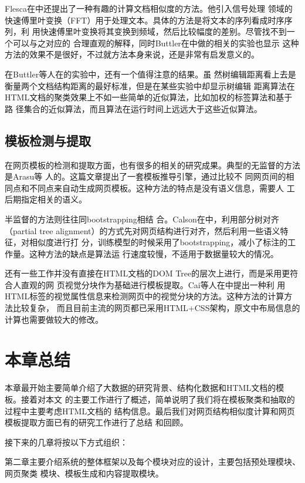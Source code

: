 Flesca在中还提出了一种有趣的计算文档相似度的方法。他引入信号处理
领域的快速傅里叶变换（FFT）用于处理文本。具体的方法是将文本的序列看成时序序列，利
用快速傅里叶变换将其变换到频域，然后比较幅度的差别。尽管找不到一个可以与之对应的
合理直观的解释，同时Buttler在中做的相关的实验也显示
这种方法的效果不是很好，不过就方法本身来说，还是非常有启发意义的。

在Buttler等人在的实验中，还有一个值得注意的结果。虽
然树编辑距离看上去是衡量两个文档结构距离的最好标准，但是在某些实验中却显示树编辑
距离算法在HTML文档的聚类效果上不如一些简单的近似算法，比如加权的标签算法和基于路
径集合的近似算法，而且算法在运行时间上远远大于这些近似算法。

\subsection{模板检测与提取}
\label{sec:relatedwork:template}
在网页模板的检测和提取方面，也有很多的相关的研究成果。典型的无监督的方法是Arasu等
人的。这篇文章提出了一套模板推导引擎，通过比较不
同网页间的相同点和不同点来自动生成网页模板。这种方法的特点是没有语义信息，需要人
工后期指定相关的语义。

半监督的方法则往往同bootstrapping相结
合。Calson在中，利用部分树对齐（partial
tree alignment）的方式先对网页结构进行对齐，然后利用一些语义特征，对相似度进行打
分，训练模型的时候采用了bootstrapping，减小了标注的工作量。这种方法的缺点是算法运
行速度较慢，不适用于数据量较大的情况。

还有一些工作并没有直接在HTML文档的DOM Tree的层次上进行，而是采用更符合人直观的网
页视觉分块作为基础进行模板提取。Cai等人在中提出一种利
用HTML标签的视觉属性信息来检测网页中的视觉分块的方法。这种方法的计算方法比较复杂，
而且目前主流的网页都已采用HTML+CSS架构，原文中布局信息的计算也需要做较大的修改。
\section{本章总结}
\label{sec:summaryintro}
本章最开始主要简单介绍了大数据的研究背景、结构化数据和HTML文档的模板。接着对本文
的主要工作进行了概述，简单说明了我们将在模板聚类和抽取的过程中主要考虑HTML文档的
结构信息。最后我们对网页结构相似度计算和网页模板提取方面已有的研究工作进行了总结
和回顾。

接下来的几章将按以下方式组织：

第二章主要介绍系统的整体框架以及每个模块对应的设计，主要包括预处理模块、网页聚类
模块、模板生成和内容提取模块。

